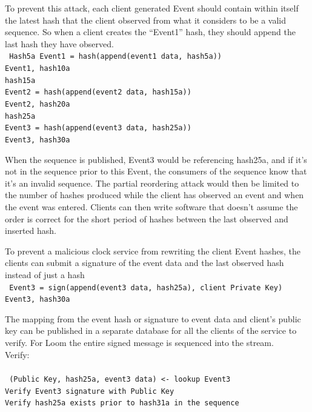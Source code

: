 \documentclass[12pt]{article}
\begin{document}
To prevent this attack, each client generated Event should contain within itself the latest hash that the client observed from what it considers to be a valid sequence.  So when a client creates the “Event1” hash, they should append the last hash they have observed.\\
\texttt{
Hash5a
Event1 = hash(append(event1 data, hash5a))\\
Event1, hash10a\\
hash15a\\
Event2 = hash(append(event2 data, hash15a))\\
Event2, hash20a\\
hash25a\\
Event3 = hash(append(event3 data, hash25a))\\
Event3, hash30a\\
}

When the sequence is published, Event3 would be referencing hash25a, and if it’s not in the sequence prior to this Event, the consumers of the sequence know that it’s an invalid sequence.  The partial reordering attack would then be limited to the number of hashes produced while the client has observed an event and when the event was entered.  Clients can then write software that doesn’t assume the order is correct for the short period of hashes between the last observed and inserted hash.

To prevent a malicious clock service from rewriting the client Event hashes, the clients can submit a signature of the event data and the last observed hash instead of just a hash\\
\texttt{
Event3 = sign(append(event3 data, hash25a), client Private Key)\\
Event3, hash30a\\
}

The mapping from the event hash or signature to event data and client’s public key can be published in a separate database for all the clients of the service to verify.  For Loom the entire signed message is sequenced into the stream.\\

\noindent Verify:\\\\\noindent
\texttt{
    (Public Key, hash25a, event3 data) <- lookup Event3 \\
    Verify Event3 signature with Public Key\\
    Verify hash25a exists prior to hash31a in the sequence\\
}
\end{document}
